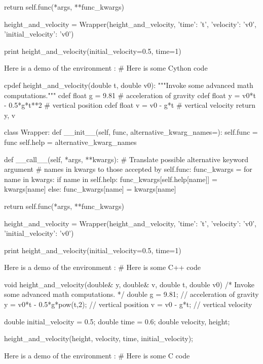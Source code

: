         return self.func(*args, **func_kwargs)

height_and_velocity = Wrapper(height_and_velocity,
                              {'time': 't',
                               'velocity': 'v0',
                               'initial_velocity': 'v0'})

print height_and_velocity(initial_velocity=0.5, time=1)


\noindent
Here is a demo of the environment :
# Here is some Cython code

cpdef height_and_velocity(double t, double v0):
    """Invoke some advanced math computations."""
    cdef float g = 9.81                  # acceleration of gravity
    cdef float y = v0*t - 0.5*g*t**2     # vertical position
    cdef float v = v0 - g*t              # vertical velocity
    return y, v

class Wrapper:
    def __init__(self, func, alternative_kwarg_names={}):
        self.func = func
        self.help = alternative_kwarg_names

    def __call__(self, *args, **kwargs):
        # Translate possible alternative keyword argument
        # names in kwargs to those accepted by self.func:
        func_kwargs = {}
        for name in kwargs:
            if name in self.help:
                func_kwargs[self.help[name]] = kwargs[name]
            else:
                func_kwargs[name] = kwargs[name]

        return self.func(*args, **func_kwargs)

height_and_velocity = Wrapper(height_and_velocity,
      {'time': 't', 'velocity': 'v0', 'initial_velocity': 'v0'})

print height_and_velocity(initial_velocity=0.5, time=1)

\noindent
Here is a demo of the environment :
# Here is some C++ code

void height_and_velocity(double& y, double& v,
                         double t, double v0)
{
    /*
    Invoke some advanced math computations.
    */
    double g = 9.81;               // acceleration of gravity
    y = v0*t - 0.5*g*pow(t,2);     // vertical position
    v = v0 - g*t;                  // vertical velocity
}

double initial_velocity = 0.5;
double time = 0.6;
double velocity, height;

height_and_velocity(height, velocity, time, initial_velocity);

\noindent
Here is a demo of the environment :
# Here is some C code


